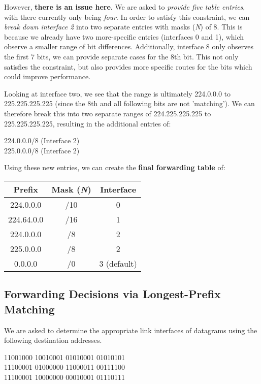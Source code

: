 \documentclass[colorlinks=true, allcolors=blue]{article}
\begin{document}
However, \textbf{there is an issue here}. We are asked to \textit{provide five table entries}, with there currently only being \textit{four}. In order to satisfy this constraint, we can \textit{break down interface 2} into two separate entries with masks (\textit{N}) of 8. This is because we already have two more-specific entries (interfaces 0 and 1), which observe a smaller range of bit differences. Additionally, interface 8 only observes the first 7 bits, we can provide separate cases for the 8th bit. This not only satisfies the constraint, but also provides more specific routes for the bits which could improve performance.

Looking at interface two, we see that the range is ultimately 224.0.0.0 to 225.225.225.225 (since the 8th and all following bits are not 'matching'). We can therefore break this into two separate ranges of 224.225.225.225 to 225.225.225.225, resulting in the additional entries of:
\begin{center}
    224.0.0.0/8  (Interface 2) \\
    225.0.0.0/8  (Interface 2)
\end{center}

Using these new entries, we can create the \textbf{final forwarding table} of:

\begin{center}
\renewcommand{\arraystretch}{1.3}
\begin{tabular}{|c|c|c|}
\hline
\textbf{Prefix}    & \textbf{Mask (\textit{N})} & \textbf{Interface} \\
\hline
224.0.0.0           & /10           & 0                  \\
\hline
224.64.0.0          & /16           & 1                  \\
\hline
224.0.0.0  & /8  & 2         \\
\hline
225.0.0.0  & /8   & 2         \\
\hline
0.0.0.0             & /0            & 3 (default)        \\
\hline
\end{tabular}
\end{center}

\subsection{Forwarding Decisions via Longest-Prefix Matching}

We are asked to determine the appropriate link interfaces of datagrams using the following destination addresses.
\begin{center}
    11001000 10010001 01010001 01010101 \\
    11100001 01000000 11000011 00111100 \\
    11100001 10000000 00010001 01110111 
\end{center}
\end{document}
